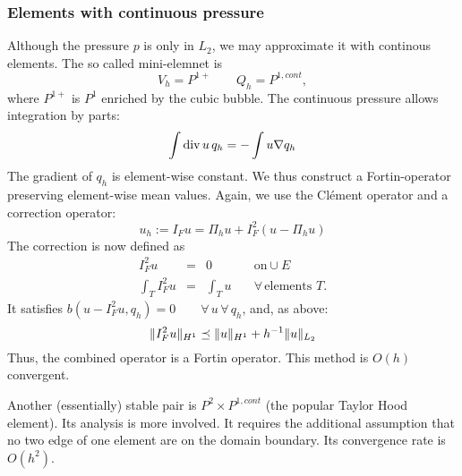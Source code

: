 \subsubsection{Elements with continuous pressure}
Although the pressure $p$ is only in $L_2$, we may approximate it with
continous elements. The so called mini-elemnet is
$$
V_h = P^{1+} \qquad Q_h = P^{1,cont},
$$
where $P^{1+}$ is $P^1$ enriched by the cubic bubble. The continuous
pressure allows integration by parts:
$$
\int \operatorname{div} u \, q_h = - \int u \nabla q_h
$$
The gradient of $q_h$ is element-wise constant. We thus construct a
Fortin-operator
preserving element-wise mean values. Again, we use the Cl\'ement operator
and a  correction operator:
$$
u_h := I_F u = \Pi_h u + I_F^2 (u - \Pi_h u)
$$
The correction is now defined as
$$
\begin{array}{rcll}
I_F^2 u & = & 0  \quad & \text{on} \cup E  \\
\int_T I_F^2 u & = & \int_T u \quad & \forall \, \text{elements } T.
\end{array}
$$
It satisfies $b(u - I_F^2 u, q_h) = 0 \qquad \forall \, u \, \forall
\, q_h$, and, as above:
$$
\| I_F^2 u \|_{H^1} \preceq \| u \|_{H^1} + h^{-1} \| u \|_{L_2}
$$
Thus, the combined operator is a Fortin operator.
This method is $O(h)$ convergent.
\medskip

Another (essentially) stable pair is $P^2 \times P^{1,cont}$ (the
popular Taylor Hood element). Its analysis is more involved. 
It requires the additional assumption that no two edge of one element are
on the domain boundary. Its convergence rate is $O(h^2)$.
% 